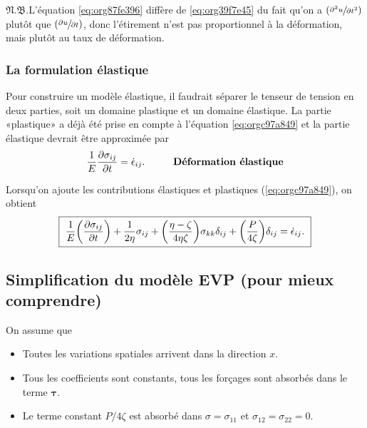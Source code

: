 \documentclass[10pt]{article}
\numberwithin{equation}{section}
\newcommand{\pt}{\hspace{1pt}} %
\newcommand{\nb}{\underline{{\footnotesize\EightStarConvex}\pt $\mathfrak{N.B.}$\vphantom{p}}\hspace{3pt}}
\begin{document}
\nb L'équation \ref{eq:org87fe396} diffère de \ref{eq:org39f7e45} du fait qu'on a \(\qty(\sfrac{\partial^2 u}{\partial t^2})\) plutôt que \(\qty(\sfrac{\partial u}{\partial t})\), donc l'étirement n'est pas proportionnel à la déformation, mais plutôt au taux de déformation.

\subsubsection{La formulation élastique}
\label{sec:orgffd4e5a}
Pour construire un modèle élastique, il faudrait séparer le tenseur de tension en deux parties, soit un domaine plastique et un domaine élastique.
La partie «plastique» a déjà été prise en compte à l'équation \ref{eq:orgc97a849} et la partie élastique devrait être approximée par
\begin{equation}
   \frac{1}{E} \pdv{\sigma_{ij}}{t} = \dot{\epsilon}_{ij}. \hspace{1cm} \text{\textbf{Déformation élastique}}
\end{equation}

Lorsqu'on ajoute les contributions élastiques et plastiques (\ref{eq:orgc97a849}), on obtient
\begin{equation}
\label{eq:org4b2bb40}
   \boxed{\ \frac{1}{E} \qty(\pdv{\sigma_{ij}}{t}) + \frac{1}{2\eta}\sigma_{ij} + \qty(\frac{\eta - \zeta}{4\eta\zeta}) \sigma_{kk} \delta_{ij} + \qty(\frac{P}{4\zeta}) \delta_{ij} = \dot{\epsilon}_{ij}.\ }
\end{equation}


\subsection{Simplification du modèle EVP (pour mieux comprendre)}
\label{sec:orgf0f049c}
On assume que
\begin{itemize}
\item Toutes les variations spatiales arrivent dans la direction \(x\).
\item Tous les coefficients sont constants, tous les forçages sont absorbés dans le terme \(\boldsymbol{\tau}\).
\item Le terme constant \(P/4\zeta\) est absorbé dans \(\sigma = \sigma_{11}\) et \(\sigma_{12}=\sigma_{22} = 0\).
\end{itemize}
\end{document}
